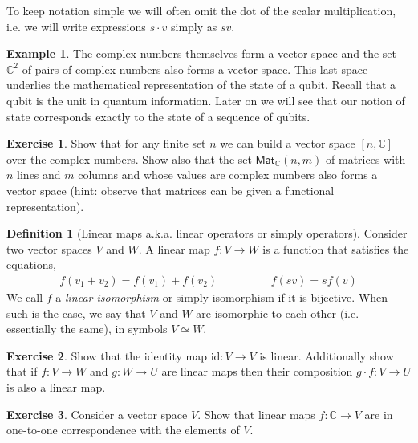 \documentclass[a4paper, 11pt]{article}
\newcommand{\complex}{\mathbb{C}}
\newcommand{\id}{\mathrm{id}}
\theoremstyle{definition}
\newtheorem{definition}{Definition}
\newtheorem{examples}{Example}
\newtheorem{exercise}{Exercise}
\begin{document}
To keep notation simple we will often omit the dot of the scalar
multiplication, i.e. we will write expressions $s \cdot v$ simply as
$s v$.

\begin{examples}
  The complex numbers themselves form a vector space and the set
  $\complex^2$ of pairs of complex numbers also forms a vector
  space. This last space underlies the mathematical representation of
  the state of a qubit. Recall that a qubit is the unit in quantum
  information. Later on we will see that our notion of state
  corresponds exactly to the state of a sequence of qubits.
\end{examples}


\begin{exercise}
  Show that for any finite set $n$ we can build a vector space
  $[n,\complex]$ over the complex numbers. Show also that the set
  $\mathsf{Mat}_\complex(n,m)$ of matrices with $n$ lines and $m$
  columns and whose values are complex numbers also forms a vector
  space (hint: observe that matrices can be given a functional
  representation).
\end{exercise}

\begin{definition}[Linear maps a.k.a. linear operators or simply operators]
  Consider two vector spaces $V$ and $W$. A linear map $f : V \to W$
  is a function that satisfies the equations,
  \begin{align*}
    f(v_1 + v_2) = f (v_1) + f(v_2) \hspace{2cm}
    f (s v) = s  f(v)
  \end{align*}
  We call $f$ a \emph{linear isomorphism} or simply isomorphism if it
  is bijective.
  When such is the case, we say that $V$ and $W$ are isomorphic to each
  other (i.e. essentially the same), in symbols $V \simeq W$.
\end{definition}

\begin{exercise}
  Show that the identity map $\id : V \to V$ is linear. Additionally show
  that if $f : V \to W$ and $g : W \to U$ are linear maps then their
  composition $g \cdot f : V \to U$ is also a linear map.
\end{exercise}

\begin{exercise}
  \label{ex:states_as_maps}
  Consider a vector space $V$. Show that linear maps
  $f : \complex \to V$ are in one-to-one correspondence with the
  elements of $V$.
\end{exercise}
\end{document}
